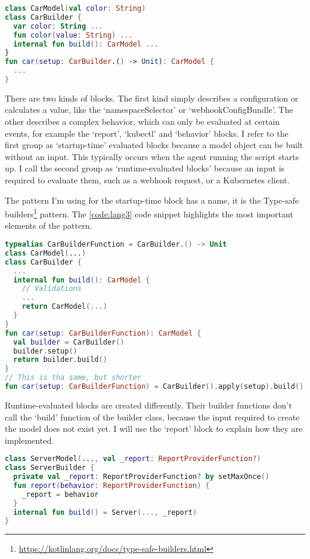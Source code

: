 \begin{lstlisting}[caption={Basic idea behind a block},language=Kotlin,label=code:lang2]
class CarModel(val color: String)
class CarBuilder {
  var color: String ...
  fun color(value: String) ...
  internal fun build(): CarModel ...
}
fun car(setup: CarBuilder.() -> Unit): CarModel {
  ...
}
\end{lstlisting}

There are two kinds of blocks. The first kind simply describes a configuration or calculates a value, like the `namespaceSelector' or `webhookConfigBundle'. The other describes a complex behavior, which can only be evaluated at certain events, for example the `report', `kubectl' and `behavior' blocks. I refer to the first group as `startup-time' evaluated blocks because a model object can be built without an input. This typically occurs when the agent running the script starts up. I call the second group as `runtime-evaluated blocks' because an input is required to evaluate them, such as a webhook request, or a Kubernetes client.

The pattern I'm using for the startup-time block has a name, it is the Type-safe builders\footnote{\url{https://kotlinlang.org/docs/type-safe-builders.html}} pattern. The \ref{code:lang3} code snippet highlights the most important elements of the pattern.

\begin{lstlisting}[caption={Type-safe builders example},language=Kotlin,label=code:lang3]
typealias CarBuilderFunction = CarBuilder.() -> Unit
class CarModel(...)
class CarBuilder {
  ...
  internal fun build(): CarModel {
    // Validations
    ...
    return CarModel(...)
  }
}
fun car(setup: CarBuilderFunction): CarModel {
  val builder = CarBuilder()
  builder.setup()
  return builder.build()
}
// This is tha same, but shorter
fun car(setup: CarBuilderFunction) = CarBuilder().apply(setup).build()
\end{lstlisting}

Runtime-evaluated blocks are created differently. Their builder functions don't call the `build' function of the builder class, because the input required to create the model does not exist yet. I will use the `report' block to explain how they are implemented.

\begin{lstlisting}[caption={Builder function of the report block},language=Kotlin,label=code:runtimeblock0]
class ServerModel(..., val _report: ReportProviderFunction?)
class ServerBuilder {
  private val _report: ReportProviderFunction? by setMaxOnce()
  fun report(behavior: ReportProviderFunction) {
    _report = behavior
  }
  internal fun build() = Server(..., _report)
}
\end{lstlisting}

